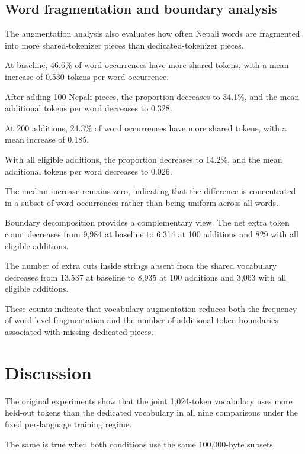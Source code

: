 \documentclass[10pt,twocolumn]{article}
\begin{document}
\subsection{Word fragmentation and boundary analysis}

The augmentation analysis also evaluates how often
Nepali words are fragmented into more shared-tokenizer
pieces than dedicated-tokenizer pieces.

At baseline, 46.6\% of word occurrences have more
shared tokens, with a mean increase of 0.530 tokens
per word occurrence.

After adding 100 Nepali pieces, the proportion decreases
to 34.1\%, and the mean additional tokens per word
decreases to 0.328.

At 200 additions, 24.3\% of word occurrences have
more shared tokens, with a mean increase of 0.185.

With all eligible additions, the proportion decreases
to 14.2\%, and the mean additional tokens per word
decreases to 0.026.

The median increase remains zero, indicating that
the difference is concentrated in a subset of word
occurrences rather than being uniform across all words.

Boundary decomposition provides a complementary view.
The net extra token count decreases from 9,984 at
baseline to 6,314 at 100 additions and 829 with all
eligible additions.

The number of extra cuts inside strings absent from
the shared vocabulary decreases from 13,537 at baseline
to 8,935 at 100 additions and 3,063 with all eligible
additions.

These counts indicate that vocabulary augmentation
reduces both the frequency of word-level fragmentation
and the number of additional token boundaries associated
with missing dedicated pieces.


\section{Discussion}

The original experiments show that the joint 1,024-token
vocabulary uses more held-out tokens than the dedicated
vocabulary in all nine comparisons under the fixed
per-language training regime.

The same is true when both conditions use the same
100,000-byte subsets.
\end{document}
